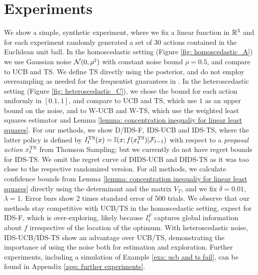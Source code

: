\section{Experiments} \label{section: experiments}
We show a simple, synthetic experiment, where we fix a linear function in $\mathbb{R}^3$ and for each experiment randomly generated a set of 30 actions contained in the Euclidean unit ball. In the homoscedastic setting (Figure \ref{fig: homoscedastic_A}) we use Gaussian noise $\mathcal{N}(0, \rho^2)$ with constant noise bound $\rho=0.5$, and compare to UCB and TS. We define TS directly using the posterior, and do not employ oversampling as needed for the frequentist guarantees in \cite{AgrawalThompsonSamplingContextual2013}. In the heteroscedastic setting (Figure \ref{fig: heteroscedastic_C}), we chose the bound for each action uniformly in $[0.1, 1]$, and compare to UCB and TS, which use $1$ as an upper bound on the noise, and to W-UCB and W-TS, which use the weighted least squares estimator and Lemma \ref{lemma: concentration inequaliy for linear least squares}. 
For our methods, we show D/IDS-F, IDS-UCB and IDS-TS, where the latter policy is defined by $I_t^{\text{TS}}(x) = \mathbb{I}(x;f(x_t^{\text{TS}})|\mathcal{F}_{t-1})$ with respect to a \emph{proposal action} $x_t^{\text{TS}}$ from Thomson Sampling; but we currently do not have regret bounds for IDS-TS. We omit the regret curve of DIDS-UCB and DIDS-TS as it was too close to the respective randomized version. For all methods, we calculate confidence bounds from Lemma \ref{lemma: concentration inequaliy for linear least squares} directly using the determinant and the matrix $V_T$, and we fix $\delta=0.01$, $\lambda=1$. Error bars show 2 times standard error of 500 trials. We observe that our methods stay competitive with UCB/TS in the homoscedastic setting, expect for IDS-F, which is over-exploring, likely because $I_t^F$ captures global information about $f$ irrespective of the location of the optimum. With heteroscedastic noise, IDS-UCB/IDS-TS show an advantage over UCB/TS, demonstrating the importance of using the noise both for estimation and exploration.
Further experiments, including a simulation of Example \ref{exa: ucb and ts fail}, can be found in Appendix \ref{app: further experiments}.\pagebreak


